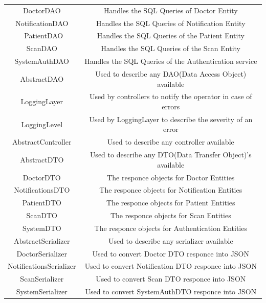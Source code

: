 			\begin{center}
				\begin{tabular}{ |c|c| } 
					\hline
					DoctorDAO & Handles the SQL Queries of Doctor Entity \\
					NotificationDAO & Handles the SQL Queries of Notification Entity  \\\
					PatientDAO & Handles the SQL Queries of the Patient Entity\\
					ScanDAO & Handles the SQL Queries of the Scan Entity\\
					SystemAuthDAO & Handles the SQL Queries of the Authentication service\\
					AbstractDAO & Used to describe any DAO(Data Access Object) available\\
					LoggingLayer & Used by controllers to notify the operator in case of errors\\
					LoggingLevel &Used by LoggingLayer to describe the severity of an error\\
					AbstractController & Used to describe any controller available\\
					AbstractDTO & Used to describe any DTO(Data Transfer Object)'s available\\
					DoctorDTO & The responce objects for Doctor Entities\\
					NotificationsDTO & The responce objects for Notification Entities\\
					PatientDTO & The responce objects for Patient Entities\\
					ScanDTO & The responce objects for Scan Entities\\
					SystemDTO & The responce objects for Authentication Entities\\
					AbstractSerializer & Used to describe any serializer available\\
					DoctorSerializer & Used to convert Doctor DTO responce into JSON\\
					NotificationsSerializer & Used to convert Notification DTO responce into JSON\\
					ScanSerializer & Used to convert Scan DTO responce into JSON\\
					SystemSerializer & Used to convert SystemAuthDTO responce into JSON\\
					\hline
				\end{tabular}
			\end{center}
